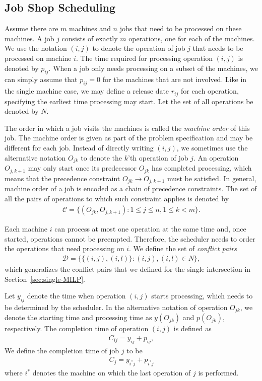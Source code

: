 \documentclass{article}
\theoremstyle{definition}
\theoremstyle{plain}
\begin{document}
\subsection{Job Shop Scheduling}

Assume there are $m$ machines and $n$ jobs that need to be processed on these
machines. A job $j$ consists of exactly $m$ operations, one for each of the
machines. We use the notation $(i,j)$ to denote the operation of job $j$ that
needs to be processed on machine $i$. The time required for processing operation
$(i,j)$ is denoted by $p_{ij}$. When a job only needs processing on a subset of
the machines, we can simply assume that $p_{ij} = 0$ for the machines that are
not involved. Like in the single machine case, we may define a release date
$r_{ij}$ for each operation, specifying the earliest time processing may start.
Let the set of all operations be denoted by $N$.

The order in which a job visits the machines is called the \textit{machine
  order} of this job. The machine order is given as part of the problem
specification and may be different for each job. Instead of directly writing
$(i,j)$, we sometimes use the alternative notation $O_{jk}$ to denote the $k$'th
operation of job $j$. An operation $O_{j,k+1}$ may only start once its
predecessor $O_{jk}$ has completed processing, which means that the precedence
constraint $O_{jk} \rightarrow O_{j,k+1}$ must be satisfied. In general, machine
order of a job is encoded as a chain of precedence constraints. The set of all
the pairs of operations to which such constraint applies is denoted by
\begin{align}
  \mathcal{C} = \{ (O_{jk}, O_{j,k+1}) : 1 \leq j \leq n, 1 \leq k < m \} .
  \label{eq:conjunctive-C}
\end{align}

Each machine $i$ can process at most one operation at the same time and, once
started, operations cannot be preempted. Therefore, the scheduler needs to order
the operations that need processing on $i$. We define the set of
\textit{conflict pairs}
\begin{align}
  \mathcal{D} = \{ \{(i,j), (i,l)\} : (i,j), (i,l) \in N \},
  \label{eq:disjunctive-D}
\end{align}
which generalizes the conflict pairs that we defined for the single intersection
in Section~\ref{sec:single-MILP}.

Let $y_{ij}$ denote the time when operation $(i,j)$ starts processing, which
needs to be determined by the scheduler. In the alternative notation of
operation $O_{jk}$, we denote the starting time and processing time as
$y(O_{jk})$ and $p(O_{jk})$, respectively. The completion time of operation
$(i,j)$ is defined as
\begin{align}
  C_{ij} = y_{ij} + p_{ij} ,
\end{align}
We define the completion time of job $j$ to be
\begin{align}
  C_{j} = y_{i^{*}j} + p_{i^{*}j}
\end{align}
where $i^{*}$ denotes the machine on which the last operation of $j$ is
performed.
\end{document}
